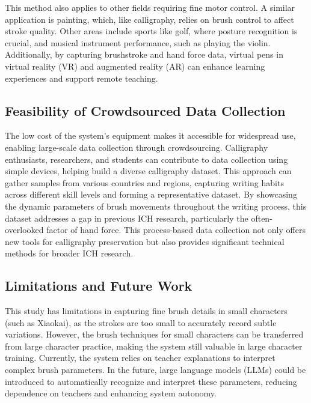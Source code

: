 This method also applies to other fields requiring fine motor control. A similar application is painting, which, like calligraphy, relies on brush control to affect stroke quality. Other areas include sports like golf, where posture recognition is crucial, and musical instrument performance, such as playing the violin. Additionally, by capturing brushstroke and hand force data, virtual pens in virtual reality (VR) and augmented reality (AR) can enhance learning experiences and support remote teaching.


\subsection{Feasibility of Crowdsourced Data Collection}
The low cost of the system's equipment makes it accessible for widespread use, enabling large-scale data collection through crowdsourcing. Calligraphy enthusiasts, researchers, and students can contribute to data collection using simple devices, helping build a diverse calligraphy dataset. This approach can gather samples from various countries and regions, capturing writing habits across different skill levels and forming a representative dataset. By showcasing the dynamic parameters of brush movements throughout the writing process, this dataset addresses a gap in previous ICH research, particularly the often-overlooked factor of hand force. This process-based data collection not only offers new tools for calligraphy preservation but also provides significant technical methods for broader ICH research.

\subsection{Limitations and Future Work}
This study has limitations in capturing fine brush details in small characters (such as Xiaokai), as the strokes are too small to accurately record subtle variations. However, the brush techniques for small characters can be transferred from large character practice, making the system still valuable in large character training. Currently, the system relies on teacher explanations to interpret complex brush parameters. In the future, large language models (LLMs) could be introduced to automatically recognize and interpret these parameters, reducing dependence on teachers and enhancing system autonomy.

